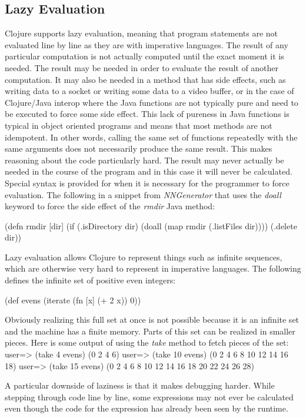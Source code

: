 \subsection{Lazy Evaluation}
Clojure supports lazy evaluation, meaning that program statements are not
evaluated line by line as they are with imperative languages. 
The result of any particular computation is not actually computed until the
exact moment it is needed.
The result may be needed in order to evaluate the result of another computation. 
It may also be needed in a method that has side effects, such as
writing data to a socket or writing some data to a video buffer, or in
the case of Clojure/Java interop where the Java functions are not
typically pure and need to be executed to force some side effect.
This lack of pureness in Java functions is typical in object oriented
programs and means that most methods are not idempotent.
In other words, calling the same set of functions repeatedly with the
same arguments does not necessarily produce the same result.
This makes reasoning about the code particularly hard.
The result may never actually be needed in the course of the program
and in this case it will never be calculated.
Special syntax is provided for when it is necessary for the programmer
to force
evaluation. The following in a snippet from {\em NNGenerator} that
uses the {\it doall} keyword to force the side effect of the {\it rmdir} Java method: 

(defn rmdir [dir]
  (if (.isDirectory dir)
      (doall (map rmdir (.listFiles dir))))
  (.delete dir))

Lazy evaluation allows Clojure to represent things such as infinite sequences,
which are otherwise very hard to represent in imperative languages. 
The following defines the infinite set of positive even integers: 

(def evens (iterate (fn [x] (+ 2 x)) 0))

Obviously realizing this full set at once is not possible because it
is an infinite set and the machine has a finite memory.
Parts of this set can be realized in smaller pieces. Here is some
output of using the {\it take} method to fetch pieces of the set: 
user=> (take 4 evens)
(0 2 4 6)
user=> (take 10 evens)
(0 2 4 6 8 10 12 14 16 18)
user=> (take 15 evens)
(0 2 4 6 8 10 12 14 16 18 20 22 24 26 28)

A particular downside of laziness is that it makes debugging harder. 
While stepping through code line by line, some expressions may not
ever be calculated even though the code for the expression has already
been seen by the runtime.

